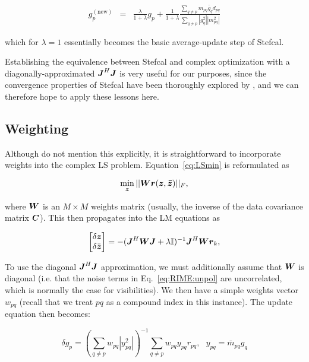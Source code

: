 \documentclass[useAMS,usenatbib]{mn2e}
\newcommand{\II}{\mathbb{I}}
\newcommand{\zz}{\bmath{z}}
\newcommand{\mat}[1]{{\bmath{#1}}}
\newcommand{\JJ}{\mat{J}} %
\begin{document}
\begin{eqnarray*}
g_p^\mathrm{(new)} &=& \frac{\lambda}{1+\lambda}g_p + \frac{1}{1+\lambda} \frac{\sum\limits_{q\ne p} m_{pq}\bar{g}_q d_{pq}}{\sum\limits_{q\ne p} |g^2_{q}| |m^2_{pq}|}
\end{eqnarray*}

which for $\lambda=1$ essentially becomes the basic average-update step of Stefcal.

Establishing the equivalence between Stefcal and complex optimization with a diagonally-approximated $\JJ^H\JJ$ is 
very useful for our purposes, since the convergence properties of Stefcal have been thoroughly explored 
by \citet{Stefcal}, and we can therefore hope to apply these lessons here.

\subsection{Weighting}

Although \citet{ComplexOpt} do not mention this explicitly, it is straightforward to incorporate weights into the 
complex LS problem. Equation~\ref{eq:LSmin} is reformulated as

\begin{equation}
\label{eq:LSmin:w}
\min_{\bmath{z}} ||\mat{W} \bmath{r}(\bmath{z},\bmath{\bar z})||_F,
\end{equation}

where $\mat{W}$ is an $M\times M$ weights matrix (usually, the inverse of the data covariance matrix $\mat{C}$). This then propagates into the 
LM equations as

\begin{equation}
\label{eq:LM:W}
\Matrix{c}{\delta \zz \\ \delta \bar{\zz}} = -(\JJ^H \mat{W} \JJ + \lambda\II)^{-1}\JJ^H \mat{W} \bmath{r}_k,
\end{equation}

To use the diagonal $\JJ^H\JJ$ approximation, we must additionally assume that $\mat{W}$ is diagonal (i.e. that the noise terms
in Eq.~\ref{eq:RIME:unpol} are uncorrelated, which is normally the case for visibilities). We then have a simple weights vector
$w_{pq}$ (recall that we treat $pq$ as a compound index in this instance). The update equation then becomes:

\begin{equation}
\label{eq:JHJ:diag:W}
\delta g_p = \left( \sum\limits_{q\ne p} w_{pq} |y^2_{pq}| \right )^{-1} \sum\limits_{q\ne p} w_{pq} y_{pq} r_{pq},~~~y_{pq}=\bar{m}_{pq} g_q
\end{equation}
\end{document}
